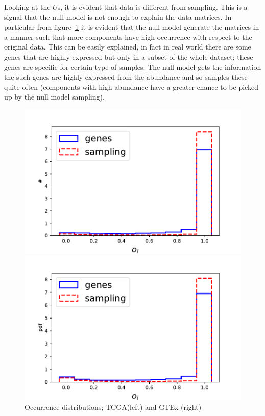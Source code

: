 Looking at the $U$s, it is evident that data is different from sampling. This is a signal that the null model is not enough to explain the data matrices. In particular from figure~\ref{fig:structure/globalU_null} it is evident that the null model generate the matrices in a manner such that more components have high occurrence with respect to the original data. This can be easily explained, in fact in real world there are some genes that are highly expressed but only in a subset of the whole dataset; these genes are specific for certain type of samples. The null model gets the information the such genes are highly expressed from the abundance and so samples these quite often (components with high abundance have a greater chance to be picked up by the null model sampling).
\begin{figure}[htb!]
\begin{minipage}{0.5\textwidth}
    \centering
    \includegraphics[width=0.95\linewidth]{pictures/structure/tcga/globalU_null.pdf}
\end{minipage}
\hspace{2mm}
\begin{minipage}{0.5\textwidth}
    \centering
    \includegraphics[width=0.95\linewidth]{pictures/structure/gtex/globalU_null.pdf}
    \end{minipage}
\caption{Occurrence distributions; TCGA(left) and GTEx (right)}
\label{fig:structure/globalU_null}
\end{figure}

